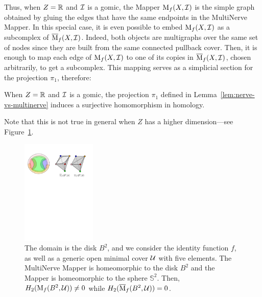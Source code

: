 Thus, when $Z=\mathbb{R}$ and $\mathcal{I}$ is a gomic, the Mapper $\mathrm{M}_f(X,\mathcal{I})$ is the simple graph
obtained by gluing the edges that have the same endpoints in the
MultiNerve Mapper. In this special case, it is even possible to
embed $\mathrm{M}_f(X,\mathcal{I})$ as a subcomplex of $\overline{\mathrm{M}}_f(X,\mathcal{I})$.
Indeed, both objects are multigraphs over the same set of nodes
since they are built from the same connected pullback cover. Then, it
is enough to map each edge of $\mathrm{M}_f(X,\mathcal{I})$ to one of its copies
in $\overline{\mathrm{M}}_f(X,\mathcal{I})$, chosen arbitrarily, to get a subcomplex. 
This mapping serves as a simplicial section for the projection $\pi_1$, therefore:
%
\begin{lem}\label{lem:pi1_surj}
When $Z=\mathbb{R}$ and $\mathcal{I}$ is a gomic, the projection $\pi_1$ defined in Lemma~\ref{lem:nerve-vs-multinerve} 
induces a surjective homomorphism in homology.
\end{lem}
%
Note that this is not true in general when $Z$ has a higher dimension---see Figure~\ref{fig:cover}.
%
\begin{figure}[t]\begin{center}
\includegraphics[height=5cm]{figures/CounterExampleHomoSurjection}
\caption[(MultiNerve) Mapper with bivariate map]{\label{fig:cover} The domain is the disk $B^2$, and we consider the identity function $f$,
as well as a generic open minimal cover $\mathcal{U}$ with five elements.
The MultiNerve Mapper is homeomorphic to the disk $B^2$ and the Mapper is homeomorphic to the sphere $\mathbb S^2$.
Then, $H_2(\mathrm{M}_f(B^2,\mathcal{U}))\neq 0$ while $H_2(\overline{\mathrm{M}}_f(B^2,\mathcal{U}))=0$.}
\end{center}\end{figure}























